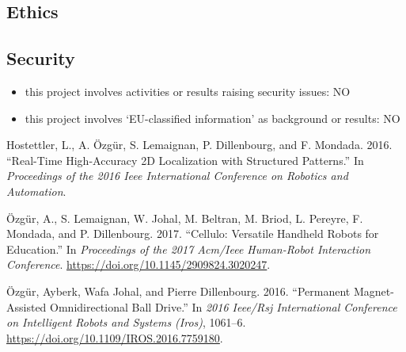 \documentclass[]{article}
\providecommand{\tightlist}{%
  \setlength{\itemsep}{0pt}\setlength{\parskip}{0pt}}
\begin{document}
\hypertarget{ethics}{%
\subsection{Ethics}\label{ethics}}

\hypertarget{security}{%
\subsection{Security}\label{security}}

\begin{itemize}
\tightlist
\item
  this project involves activities or results raising security issues:
  NO
\item
  this project involves `EU-classified information' as background or
  results: NO
\end{itemize}

\hypertarget{refs}{}
\leavevmode\hypertarget{ref-hostettler2016realtime}{}%
Hostettler, L., A. Özgür, S. Lemaignan, P. Dillenbourg, and F. Mondada.
2016. ``Real-Time High-Accuracy 2D Localization with Structured
Patterns.'' In \emph{Proceedings of the 2016 Ieee International
Conference on Robotics and Automation}.

\leavevmode\hypertarget{ref-ozgur2017cellulo}{}%
Özgür, A., S. Lemaignan, W. Johal, M. Beltran, M. Briod, L. Pereyre, F.
Mondada, and P. Dillenbourg. 2017. ``Cellulo: Versatile Handheld Robots
for Education.'' In \emph{Proceedings of the 2017 Acm/Ieee Human-Robot
Interaction Conference}. \url{https://doi.org/10.1145/2909824.3020247}.

\leavevmode\hypertarget{ref-ozgur2016permanent}{}%
Özgür, Ayberk, Wafa Johal, and Pierre Dillenbourg. 2016. ``Permanent
Magnet-Assisted Omnidirectional Ball Drive.'' In \emph{2016 Ieee/Rsj
International Conference on Intelligent Robots and Systems (Iros)},
1061--6. \url{https://doi.org/10.1109/IROS.2016.7759180}.
\end{document}

